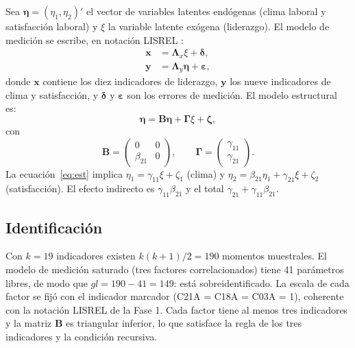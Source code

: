 \documentclass[11pt,a4paper]{article}
\newcommand{\df}{\textit{gl}}
\begin{document}
Sea $\boldsymbol{\eta} = (\eta_1, \eta_2)'$ el vector de variables latentes endógenas
(clima laboral y satisfacción laboral) y $\xi$ la variable latente exógena (liderazgo). El
modelo de medición se escribe, en notación LISREL \citep{bollen1989}:
\begin{align}
\mathbf{x} &= \boldsymbol{\Lambda}_x \xi + \boldsymbol{\delta}, \label{eq:x}\\
\mathbf{y} &= \boldsymbol{\Lambda}_y \boldsymbol{\eta} + \boldsymbol{\varepsilon}, \label{eq:y}
\end{align}
donde $\mathbf{x}$ contiene los diez indicadores de liderazgo, $\mathbf{y}$ los nueve
indicadores de clima y satisfacción, y $\boldsymbol{\delta}$ y $\boldsymbol{\varepsilon}$
son los errores de medición. El modelo estructural es:
\begin{equation}
\boldsymbol{\eta} = \mathbf{B}\boldsymbol{\eta} + \boldsymbol{\Gamma}\xi + \boldsymbol{\zeta},
\label{eq:est}
\end{equation}
con
\begin{equation}
\mathbf{B} = \begin{pmatrix} 0 & 0 \\ \beta_{21} & 0 \end{pmatrix}, \qquad
\boldsymbol{\Gamma} = \begin{pmatrix} \gamma_{11} \\ \gamma_{21} \end{pmatrix}.
\label{eq:matrices}
\end{equation}
La ecuación~\eqref{eq:est} implica $\eta_1 = \gamma_{11}\xi + \zeta_1$ (clima) y
$\eta_2 = \beta_{21}\eta_1 + \gamma_{21}\xi + \zeta_2$ (satisfacción). El efecto indirecto
es $\gamma_{11}\beta_{21}$ y el total $\gamma_{21} + \gamma_{11}\beta_{21}$.

\subsection{Identificación}

Con $k = 19$ indicadores existen $k(k+1)/2 = 190$ momentos muestrales. El modelo de medición
saturado (tres factores correlacionados) tiene 41 parámetros libres, de modo que
$\df = 190 - 41 = 149$: está sobreidentificado. La escala de cada factor se fijó con el
indicador marcador (C21A = C18A = C03A = 1), coherente con la notación LISREL de la Fase 1.
Cada factor tiene al menos tres indicadores y la matriz $\mathbf{B}$ es triangular inferior,
lo que satisface la regla de los tres indicadores y la condición recursiva.
\end{document}
